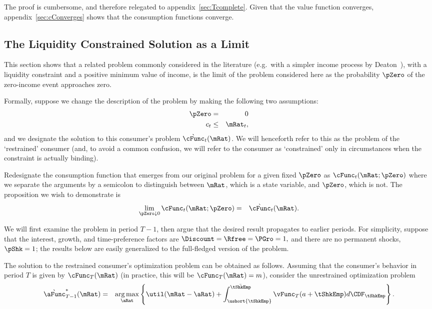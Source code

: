 \documentclass[titlepage]{\econtex}\providecommand{\texname}{BufferStockTheory}%
\begin{document}
The proof is cumbersome, and therefore relegated to
appendix~\ref{sec:Tcomplete}.  Given that the value function
converges, appendix~\ref{sec:cConverges} shows that the consumption
functions converge.


\subsection{The Liquidity Constrained Solution as a Limit} \label{sec:deatonIsLimit}

This section shows that a related problem commonly considered in the
literature (e.g.\ with a simpler income process by
Deaton~\citeyearpar{deatonLiqConstr}), with a liquidity constraint
and a positive minimum value of income, is the limit of the problem
considered here as the probability $\pZero$ of the zero-income event
approaches zero.

Formally, suppose we change the description of the problem by making
the following two assumptions:
\begin{eqnarray*}
    \pZero  & = & 0
\\  c_{t} & \leq & \mRat_{t} \label{eq:liqconstr},
\end{eqnarray*}
and we designate the solution to this consumer's problem
$\grave{\cFunc}_{t}(\mRat)$.  We will henceforth refer to this as the
problem of the `restrained' consumer (and, to avoid a common
confusion, we will refer to the consumer as `constrained' only in
circumstances when the constraint is actually binding).

Redesignate the consumption function that emerges from our original
problem for a given fixed $\pZero$ as $\cFunc_{t}(\mRat;\pZero)$ where we
separate the arguments by a semicolon to distinguish between $\mRat$,
which is a state variable, and $\pZero$, which is not.  The
proposition we wish to demonstrate is
\begin{eqnarray}
  \lim_{\pZero \downarrow 0} \cFunc_{t}(\mRat;\pZero) & = & \grave{\cFunc}_{t}(\mRat). \label{eq:RestrEqUnrestr} \notag
\end{eqnarray}

We will first examine the problem in period $T-1$, then
argue that the desired result propagates to earlier periods.
For simplicity, suppose that the interest, growth, and time-preference
factors are $\Discount = \Rfree = \PGro = 1,$ and there are no permanent
shocks, $\pShk=1$; the results below are easily generalized
to the full-fledged version of the problem.

The solution to the restrained consumer's optimization problem can be
obtained as follows.  Assuming that the consumer's behavior in period
$T$ is given by $\cFunc_{T}(\mRat)$ (in practice, this will be
$\cFunc_{T}(\mRat)=m$), consider the unrestrained optimization problem
\begin{eqnarray}
  \grave{\aFunc}^{*}_{T-1}(\mRat) & = & \underset{\aRat}{\arg \max} \left\{\util(\mRat-\aRat) +  \int_{\ushort{\tShkEmp}}^{\bar{\tShkEmp}} \vFunc_{T}(a+\tShkEmp) d\CDF_{\tShkEmp} \right\}. \label{eq:vUnconstr}
\end{eqnarray}
\end{document}
